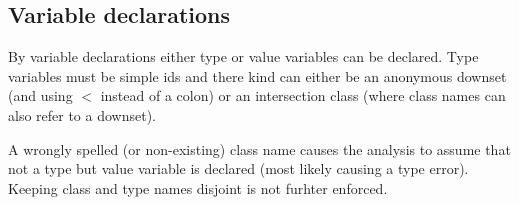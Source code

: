 \documentclass{article}
\begin{document}
\subsection{Variable declarations}

By variable declarations either type or value variables can be declared.
Type variables must be simple ids and there kind can either be an anonymous
downset (and using $<$ instead of a colon) or an intersection class (where
class names can also refer to a downset).

A wrongly spelled (or non-existing) class name causes the analysis to assume
that not a type but value variable is declared (most likely causing a type
error). Keeping class and type names disjoint is not furhter enforced.
\end{document}
